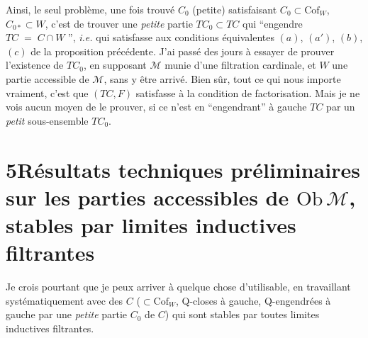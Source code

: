 \documentclass[11pt]{article}
\newcommand{\msp}[1]{\marginpar{\footnotesize [#1]}}
\newcommand{\Cof}{\mathrm{Cof}}
\begin{document}
\msp{page 43}
Ainsi, le seul problème, une fois trouvé $C_0$ (petite) satisfaisant $C_0\subset\Cof_W$, $C_{0*}\subset W$, c'est de trouver une \textit{petite} partie $TC_0\subset TC$ qui “engendre $TC\;=\;C\cap W$ ”, \textit{i.e.} qui satisfasse aux conditions équivalentes $(a)$, $(a')$, $(b)$, $(c)$ de la proposition précédente. J'ai passé des jours à essayer de prouver l'existence de $TC_0$, en supposant $\mathcal{M}$ munie d'une filtration cardinale, et $W$ une partie accessible de $\mathcal{M}$, sans y être arrivé. Bien sûr, tout ce qui nous importe vraiment, c'est que $(TC,F)$ satisfasse à la condition de factorisation. Mais je ne vois aucun moyen de le prouver, si ce n'est en “engendrant” à gauche $TC$ par un \textit{petit} sous-ensemble $TC_0$.

\section*{5\quad Résultats techniques préliminaires sur les parties accessibles de $\mathrm{Ob}\,\mathcal{M}$, stables par limites inductives filtrantes}

Je crois pourtant que je peux arriver à quelque chose d'utilisable, en travaillant systématiquement avec des $C$ ($\subset\Cof_W$, Q-closes à gauche, Q-engendrées à gauche par une \textit{petite} partie $C_0$ de $C$) qui sont stables par toutes limites inductives filtrantes.
\end{document}

